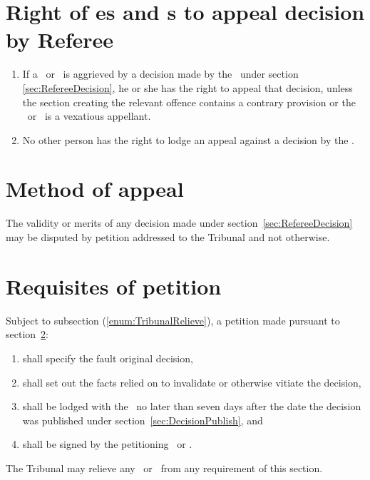 \documentclass[12pt]{report}
\begin{document}
  \section{Right of \xCaptain es and \xPresident s to appeal decision by Referee}\label{sec:TribunalAppeal}
  \begin{enumerate}
    \item If a \Captain\ or \President\ is aggrieved by a decision made by the \Referee\ under section \ref{sec:RefereeDecision}, he or she has the right to appeal that decision, unless the section creating the relevant offence contains a contrary provision or the \Coach\ or \President\ is a  vexatious appellant.
    \item No other person has the right to lodge an appeal against a decision by the \Referee.
  \end{enumerate}
  \section{Method of appeal}\label{sec:MethodOfAppeal}
  \begin{fenumerate}
    \item The validity or merits of any decision made under section~\ref{sec:RefereeDecision} may be disputed by petition addressed to the Tribunal and not otherwise.
  \end{fenumerate}
  \section{Requisites of petition}
  \begin{fenumerate}
    \item Subject to subsection \thesection(\ref{enum:TribunalRelieve}), a petition made pursuant to section~\ref{sec:MethodOfAppeal}:
    \begin{enumerate}
          \item shall specify the fault original decision,
      \item shall set out the facts relied on to invalidate or otherwise vitiate the decision,
      \item shall be lodged with the \RaceDirector\ no later than seven days after the date the decision was published under section~\ref{sec:DecisionPublish}, and
      \item shall be signed by the petitioning \Coach\ or \President.
    \end{enumerate}
    \item The Tribunal may relieve any \Coach\ or \President\ from any requirement of this section.\label{enum:TribunalRelieve}
  \end{fenumerate}
\end{document}
